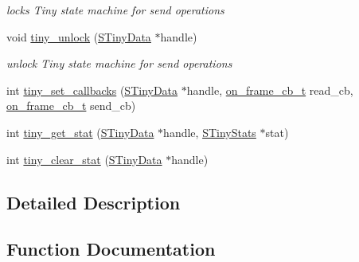 \begin{DoxyCompactItemize}
\begin{DoxyCompactList}\small\item\em locks Tiny state machine for send operations \end{DoxyCompactList}\item 
void \hyperlink{group__ADVANCED__API_gae4bfad55a4ef5814a5af50f044f6d7cd}{tiny\+\_\+unlock} (\hyperlink{structSTinyData}{S\+Tiny\+Data} $\ast$handle)
\begin{DoxyCompactList}\small\item\em unlock Tiny state machine for send operations \end{DoxyCompactList}\item 
int \hyperlink{group__ADVANCED__API_gac562103dd1699b82fddf29dccdc0ec7c}{tiny\+\_\+set\+\_\+callbacks} (\hyperlink{structSTinyData}{S\+Tiny\+Data} $\ast$handle, \hyperlink{tiny__layer2_8h_ad6bf709565b8aecb9e6ecf196f219d54}{on\+\_\+frame\+\_\+cb\+\_\+t} read\+\_\+cb, \hyperlink{tiny__layer2_8h_ad6bf709565b8aecb9e6ecf196f219d54}{on\+\_\+frame\+\_\+cb\+\_\+t} send\+\_\+cb)
\item 
int \hyperlink{group__ADVANCED__API_ga5f61774b2027a91f772f31d943acdd3f}{tiny\+\_\+get\+\_\+stat} (\hyperlink{structSTinyData}{S\+Tiny\+Data} $\ast$handle, \hyperlink{structSTinyStats}{S\+Tiny\+Stats} $\ast$stat)
\item 
int \hyperlink{group__ADVANCED__API_gac75ee03ea3691b0a8bf842d764b342d9}{tiny\+\_\+clear\+\_\+stat} (\hyperlink{structSTinyData}{S\+Tiny\+Data} $\ast$handle)
\end{DoxyCompactItemize}


\subsection{Detailed Description}


\subsection{Function Documentation}
\hypertarget{group__ADVANCED__API_gac75ee03ea3691b0a8bf842d764b342d9}{}
